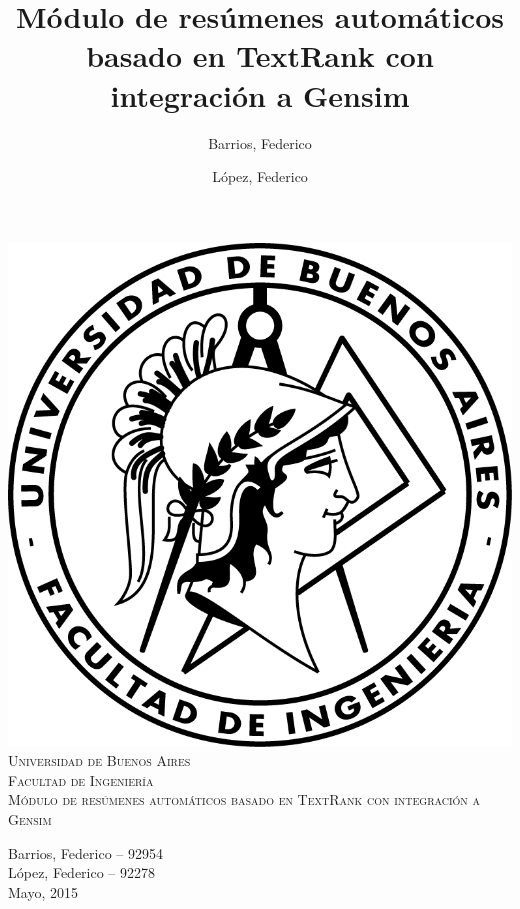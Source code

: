 \documentclass[a4paper]{article}
\title{Módulo de resúmenes automáticos basado en TextRank con integración a Gensim}
\author{Barrios, Federico \and López, Federico}
\begin{document}
\thispagestyle{empty}
\begin{center}
\includegraphics{logo-fiuba.png}\\
\vspace{1cm}
\textsc{\LARGE Universidad de Buenos Aires}\\[0.3cm]
\textsc{\LARGE Facultad de Ingeniería}\\[1.2cm]
\textsc{\LARGE Módulo de resúmenes automáticos basado en TextRank con integración a Gensim}\\[0.3cm]
\end{center}

\vspace{20 mm}

\begin{flushright}
{\large
Barrios, Federico -- 92954\\
L\'opez, Federico -- 92278\\[0.1cm]
\vspace{2cm}
Mayo, 2015}
\end{flushright}

\pagestyle{fancy}
\newpage

\footnotesize


\newpage
\setcounter{page}{1}
\tableofcontents

\newpage
\end{document}
